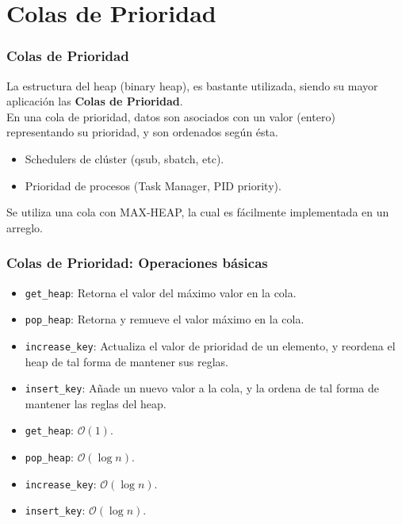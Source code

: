 \documentclass{beamer}
\begin{document}
\section{Colas de Prioridad}
\begin{frame}[fragile]
 \frametitle{Colas de Prioridad}
\small La estructura del heap (binary heap), es bastante utilizada, siendo su mayor aplicación las \textbf{Colas de Prioridad}. \\

En una cola de prioridad, datos son asociados con un valor (entero) representando su prioridad, y son ordenados según ésta. 

\begin{itemize}
\item Schedulers de clúster (qsub, sbatch, etc).
\item Prioridad de procesos (Task Manager, PID priority).
\end{itemize}

Se utiliza una cola con MAX-HEAP, la cual es fácilmente implementada en un arreglo. 
\end{frame}

\begin{frame}[fragile]
 \frametitle{Colas de Prioridad: Operaciones básicas}
\small 

\begin{itemize}
\item \texttt{get\_heap}: Retorna el valor del máximo valor en la cola.
\item \texttt{pop\_heap}: Retorna y remueve el valor máximo en la cola. 
\item \texttt{increase\_key}: Actualiza el valor de prioridad de un elemento, y reordena el heap de tal forma de mantener sus reglas. 
\item \texttt{insert\_key}: Añade un nuevo valor a la cola, y la ordena de tal forma de mantener las reglas del heap.
\end{itemize}


\begin{itemize}
\item \texttt{get\_heap}: $\mathcal{O}(1)$.
\item \texttt{pop\_heap}: $\mathcal{O}(\log n)$.
\item \texttt{increase\_key}: $\mathcal{O}(\log n)$.
\item \texttt{insert\_key}: $\mathcal{O}(\log n)$. 
\end{itemize}

\end{frame}
\end{document}
